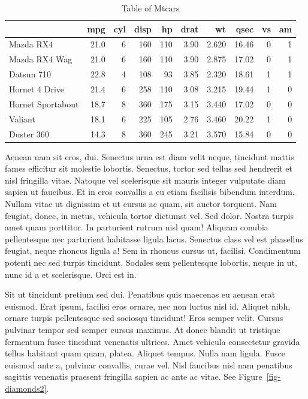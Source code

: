 \documentclass[
  9pt,
  letterpaper,
  DIV=11,
  numbers=noendperiod]{scrartcl}
\begin{document}
\hypertarget{tbl-mtcars}{}
\begin{table}
\caption{\label{tbl-mtcars}Table of Mtcars }\tabularnewline

\centering
\begin{tabular}{l|r|r|r|r|r|r|r|r|r}
\hline
  & mpg & cyl & disp & hp & drat & wt & qsec & vs & am\\
\hline
Mazda RX4 & 21.0 & 6 & 160 & 110 & 3.90 & 2.620 & 16.46 & 0 & 1\\
\hline
Mazda RX4 Wag & 21.0 & 6 & 160 & 110 & 3.90 & 2.875 & 17.02 & 0 & 1\\
\hline
Datsun 710 & 22.8 & 4 & 108 & 93 & 3.85 & 2.320 & 18.61 & 1 & 1\\
\hline
Hornet 4 Drive & 21.4 & 6 & 258 & 110 & 3.08 & 3.215 & 19.44 & 1 & 0\\
\hline
Hornet Sportabout & 18.7 & 8 & 360 & 175 & 3.15 & 3.440 & 17.02 & 0 & 0\\
\hline
Valiant & 18.1 & 6 & 225 & 105 & 2.76 & 3.460 & 20.22 & 1 & 0\\
\hline
Duster 360 & 14.3 & 8 & 360 & 245 & 3.21 & 3.570 & 15.84 & 0 & 0\\
\hline
\end{tabular}
\end{table}

Aenean nam sit eros, dui. Senectus urna est diam velit neque, tincidunt
mattis fames efficitur sit molestie lobortis. Senectus, tortor sed
tellus sed hendrerit et nisl fringilla vitae. Natoque vel scelerisque
sit mauris integer vulputate diam sapien ut faucibus. Et in eros
convallis a eu etiam facilisis bibendum interdum. Nullam vitae ut
dignissim et ut cursus ac quam, sit auctor torquent. Nam feugiat, donec,
in metus, vehicula tortor dictumst vel. Sed dolor. Nostra turpis amet
quam porttitor. In parturient rutrum nisl quam! Aliquam conubia
pellentesque nec parturient habitasse ligula lacus. Senectus class vel
est phasellus feugiat, neque rhoncus ligula a! Sem in rhoncus cursus ut,
facilisi. Condimentum potenti nec sed turpis tincidunt. Sodales sem
pellentesque lobortis, neque in ut, nunc id a et scelerisque. Orci est
in.

\newpage{}

Sit ut tincidunt pretium sed dui. Penatibus quis maecenas eu aenean erat
euismod. Erat ipsum, facilisi eros ornare, nec non luctus nisl id.
Aliquet nibh, ornare turpis pellentesque sed sociosqu tincidunt! Eros
semper velit. Cursus pulvinar tempor sed semper cursus maximus. At donec
blandit ut tristique fermentum fusce tincidunt venenatis ultrices. Amet
vehicula consectetur gravida tellus habitant quam quam, platea. Aliquet
tempus. Nulla nam ligula. Fusce euismod ante a, pulvinar convallis,
curae vel. Nisl faucibus nisl nam penatibus sagittis venenatis praesent
fringilla sapien ac ante ac vitae. See Figure~\ref{fig-diamonds2}.
\end{document}
